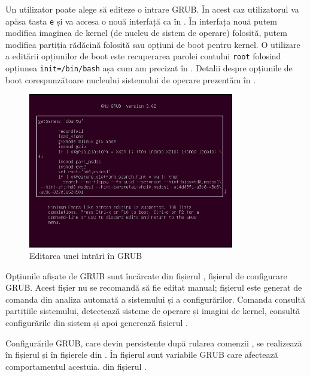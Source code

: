 Un utilizator poate alege să editeze o intrare GRUB. În acest caz utilizatorul
va apăsa tasta \texttt{e} și va accesa o nouă interfață ca în .
În interfața nouă putem modifica imaginea de kernel (de nucleu de sistem de operare)
folosită, putem modifica partiția rădăcină folosită sau opțiuni de boot pentru
kernel. O utilizare a editării opțiunilor de boot este recuperarea parolei
contului \texttt{root} folosind opțiunea \texttt{init=/bin/bash} așa cum am precizat în
. Detalii despre
opțiunile de boot corespunzătoare nucleului sistemului de operare prezentăm în
.

\begin{figure}[!htbp]
  \centering
  \includegraphics[width=0.8\textwidth]{chapters/09-boot/img/edit-grub.png}
  \caption{Editarea unei intrări în GRUB}
  \label{fig:boot:edit-grub}
\end{figure}

Opțiunile afișate de GRUB sunt încărcate din fișierul ,
fișierul de configurare GRUB. Acest fișier nu se recomandă să fie editat manual;
fișierul este generat de comanda  din analiza automată a sistemului și a configurărilor.
Comanda  consultă
partițiile sistemului, detectează sisteme de operare și imagini de kernel,
consultă configurările din sistem și apoi generează fișierul
.

Configurările GRUB, care devin persistente după rularea comenzii , se
realizează în fișierul  și în fișierele din . În
fișierul  sunt variabile GRUB care afectează comportamentul
acestuia.  din fișierul .

